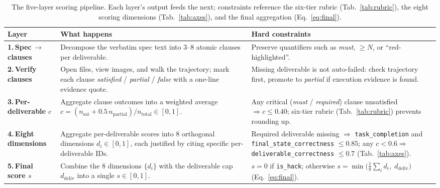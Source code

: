 \documentclass{llmxive}
\providecommand{\arraystretch}{1.2}
\begin{document}
\begin{table}[!htbp]
\centering
\footnotesize
\setlength{\tabcolsep}{6pt}
\renewcommand{\arraystretch}{1.35}
\begin{tabular}{@{}>{\bfseries}l >{\arraybackslash}p{6.0cm} >{\arraybackslash}p{6.4cm}@{}}
\toprule
\textbf{Layer} & \textbf{What happens} & \textbf{Hard constraints} \\
\midrule
1.\,Spec$\,\to\,$clauses
  & Decompose the verbatim spec text into 3--8 atomic clauses per deliverable.
  & Preserve quantifiers such as \emph{must}, $\geq N$, or ``red-highlighted''. \\
2.\,Verify clauses
  & Open files, view images, and walk the trajectory; mark each clause \emph{satisfied} / \emph{partial} / \emph{false} with a one-line evidence quote.
  & Missing deliverable is not auto-failed: check trajectory first, promote to \emph{partial} if execution evidence is found. \\
3.\,Per-deliverable $c$
  & Aggregate clause outcomes into a weighted average $c = (n_{\text{sat}} + 0.5\,n_{\text{partial}}) / n_{\text{total}} \in [0,1]$.
  & Any critical (\emph{must} / \emph{required}) clause unsatisfied $\Rightarrow c \leq 0.40$; six-tier rubric (Tab.~\ref{tab:rubric}) prevents rounding up. \\
4.\,Eight dimensions
  & Aggregate per-deliverable scores into 8 orthogonal dimensions $d_i \in [0,1]$, each justified by citing specific per-deliverable IDs.
  & Required deliverable missing $\Rightarrow$ \texttt{task\_completion} and \texttt{final\_state\_correctness} $\leq 0.85$; any $c < 0.6 \Rightarrow$ \texttt{deliverable\_correctness} $\leq 0.7$ (Tab.~\ref{tab:axes}). \\
5.\,Final score $s$
  & Combine the 8 dimensions $\{d_i\}$ with the deliverable cap $d_{\text{deliv}}$ into a single $s \in [0,1]$.
  & $s = 0$ if \texttt{is\_hack}; otherwise $s = \min\!\big(\tfrac{1}{8}\sum_i d_i,\; d_{\text{deliv}}\big)$ (Eq.~\ref{eq:final}). \\
\bottomrule
\end{tabular}
\caption{The five-layer scoring pipeline. Each layer's output feeds the next; constraints reference the six-tier rubric (Tab.~\ref{tab:rubric}), the eight scoring dimensions (Tab.~\ref{tab:axes}), and the final aggregation (Eq.~\ref{eq:final}).}
\label{tab:layers}
\end{table}
\end{document}
